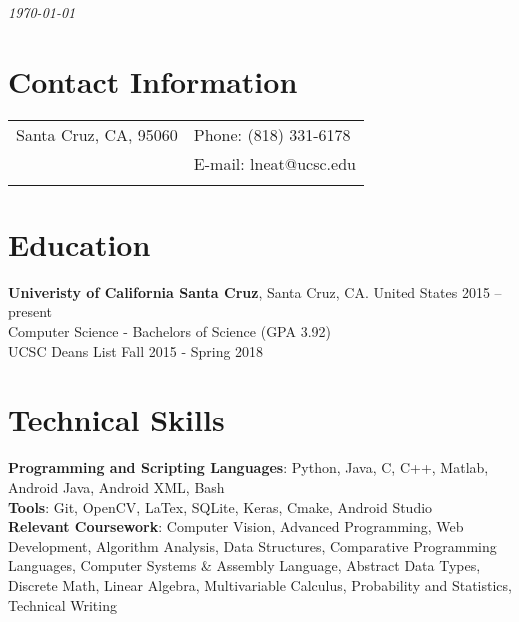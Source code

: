 \documentclass[margin,line]{res}
\begin{document}
 \hfill {\em \today}

\begin{resume}
\section{\sc Contact Information}

\vspace{.05in}
\begin{tabular}{@{}p{3.5in}p{3in}} Santa Cruz, CA, 95060           & {Phone:}  (818) 331-6178 \\

 & {E-mail:}  lneat@ucsc.edu\\
 \\
 
\end{tabular}

\section{\sc Education}
{\bf Univeristy of California Santa Cruz}, Santa Cruz, CA. United States \hfill 2015 -- present\\
Computer Science - Bachelors of Science \hfill(GPA 3.92)\\
UCSC Deans List \hfill Fall 2015 - Spring 2018 

\section{\sc Technical Skills}
{\bf Programming and Scripting Languages}: Python, Java, C, C++,  Matlab, Android Java, Android XML, Bash \vspace{2mm} \\ 
{\bf Tools}: Git, OpenCV, LaTex, SQLite, Keras, Cmake, Android Studio \vspace{2mm}   \\
{\bf Relevant Coursework}: Computer Vision, Advanced Programming, Web Development, Algorithm Analysis, Data Structures, Comparative Programming Languages, Computer Systems \& Assembly Language, Abstract Data Types, Discrete Math, Linear Algebra,  Multivariable Calculus, Probability and Statistics, Technical Writing \\

\end{resume}
\end{document}
